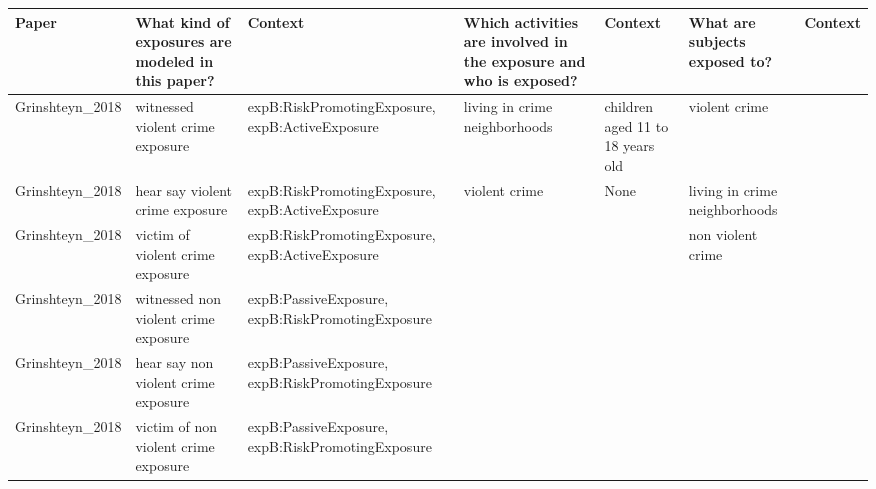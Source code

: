 \begin{tabular}{p{1cm}p{1cm}p{1cm}p{1cm}p{1cm}p{1cm}p{1cm}}
\toprule
          Paper & What kind of exposures are modeled in this paper? &                                          Context & Which activities are involved in the exposure and who is exposed? &                          Context & What are subjects exposed to? & Context \\
\midrule
Grinshteyn\_2018 & witnessed violent crime exposure & expB:RiskPromotingExposure, expB:ActiveExposure & living in crime neighborhoods & children aged 11 to 18 years old & violent crime &  \\
Grinshteyn\_2018 & hear say violent crime exposure & expB:RiskPromotingExposure, expB:ActiveExposure & violent crime & None & living in crime neighborhoods &  \\
Grinshteyn\_2018 & victim of violent crime exposure & expB:RiskPromotingExposure, expB:ActiveExposure &  &  & non violent crime &  \\
Grinshteyn\_2018 & witnessed non violent crime exposure & expB:PassiveExposure, expB:RiskPromotingExposure &  &  &  &  \\
Grinshteyn\_2018 & hear say non violent crime exposure & expB:PassiveExposure, expB:RiskPromotingExposure &  &  &  &  \\
Grinshteyn\_2018 & victim of non violent crime exposure & expB:PassiveExposure, expB:RiskPromotingExposure &  &  &  &  \\
\bottomrule
\end{tabular}
